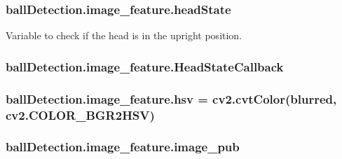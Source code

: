 \subsubsection[{\texorpdfstring{head\+State}{headState}}]{\setlength{\rightskip}{0pt plus 5cm}ball\+Detection.\+image\+\_\+feature.\+head\+State\hspace{0.3cm}{\ttfamily [static]}}\hypertarget{classballDetection_1_1image__feature_ac4aef32147d5a7ab2a5702b96d123ca5}{}\label{classballDetection_1_1image__feature_ac4aef32147d5a7ab2a5702b96d123ca5}


Variable to check if the head is in the upright position. 

\subsubsection[{\texorpdfstring{Head\+State\+Callback}{HeadStateCallback}}]{\setlength{\rightskip}{0pt plus 5cm}ball\+Detection.\+image\+\_\+feature.\+Head\+State\+Callback\hspace{0.3cm}{\ttfamily [static]}}\hypertarget{classballDetection_1_1image__feature_a17e637dcbb2639eab5dfefd9eccfb7d5}{}\label{classballDetection_1_1image__feature_a17e637dcbb2639eab5dfefd9eccfb7d5}
\subsubsection[{\texorpdfstring{hsv}{hsv}}]{\setlength{\rightskip}{0pt plus 5cm}ball\+Detection.\+image\+\_\+feature.\+hsv = cv2.\+cvt\+Color({\bf blurred}, cv2.\+C\+O\+L\+O\+R\+\_\+\+B\+G\+R2\+H\+SV)\hspace{0.3cm}{\ttfamily [static]}}\hypertarget{classballDetection_1_1image__feature_a86c8b7e7581075179dea815950abb95f}{}\label{classballDetection_1_1image__feature_a86c8b7e7581075179dea815950abb95f}
\subsubsection[{\texorpdfstring{image\+\_\+pub}{image_pub}}]{\setlength{\rightskip}{0pt plus 5cm}ball\+Detection.\+image\+\_\+feature.\+image\+\_\+pub}\hypertarget{classballDetection_1_1image__feature_a7873b5a7def0a26beb3bb7d08d51d5fe}{}\label{classballDetection_1_1image__feature_a7873b5a7def0a26beb3bb7d08d51d5fe}


